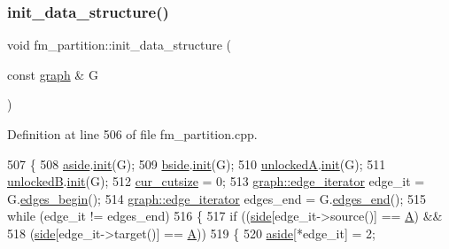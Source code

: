 \subsubsection{\texorpdfstring{init\+\_\+data\+\_\+structure()}{init\_data\_structure()}}
{\footnotesize\ttfamily void fm\+\_\+partition\+::init\+\_\+data\+\_\+structure (\begin{DoxyParamCaption}\item[{const \mbox{\hyperlink{classgraph}{graph}} \&}]{G }\end{DoxyParamCaption})\hspace{0.3cm}{\ttfamily [protected]}}



Definition at line 506 of file fm\+\_\+partition.\+cpp.


\begin{DoxyCode}
507 \{
508     \mbox{\hyperlink{classfm__partition_a14b0aa9a91a6e7fa3035669cf5056275}{aside}}.\mbox{\hyperlink{classne__map_a4ef2ab4aebcb57a7a101975bf6a88e24}{init}}(G);
509     \mbox{\hyperlink{classfm__partition_aa75765887173fb06b076b6cae12d4e66}{bside}}.\mbox{\hyperlink{classne__map_a4ef2ab4aebcb57a7a101975bf6a88e24}{init}}(G);
510     \mbox{\hyperlink{classfm__partition_a9d75a1d63f711a0c66ae7f5bc181cd8b}{unlockedA}}.\mbox{\hyperlink{classne__map_a4ef2ab4aebcb57a7a101975bf6a88e24}{init}}(G);
511     \mbox{\hyperlink{classfm__partition_a74865bf3e6b6f73350c43c3ad9dfda96}{unlockedB}}.\mbox{\hyperlink{classne__map_a4ef2ab4aebcb57a7a101975bf6a88e24}{init}}(G);
512     \mbox{\hyperlink{classfm__partition_abc8f24c354d2a15f8ec8ef9a46252c93}{cur\_cutsize}} = 0;
513     \mbox{\hyperlink{classgraph_a818d3766018eb0af91d520ce2150203c}{graph::edge\_iterator}} edge\_it = G.\mbox{\hyperlink{classgraph_a7ba35a4c4e8343ffb27ed6d9703c6f18}{edges\_begin}}();
514     \mbox{\hyperlink{classgraph_a818d3766018eb0af91d520ce2150203c}{graph::edge\_iterator}} edges\_end = G.\mbox{\hyperlink{classgraph_aea8d7f976b85b6137f52d915e26639f6}{edges\_end}}();
515     \textcolor{keywordflow}{while} (edge\_it != edges\_end)
516     \{
517     \textcolor{keywordflow}{if} ((\mbox{\hyperlink{classfm__partition_af83309e781e9658fc0ff923ced087bfc}{side}}[edge\_it->source()] == \mbox{\hyperlink{classfm__partition_a738e75c601403754e61e6dac623fd3ab}{A}}) &&
518         (\mbox{\hyperlink{classfm__partition_af83309e781e9658fc0ff923ced087bfc}{side}}[edge\_it->target()] == \mbox{\hyperlink{classfm__partition_a738e75c601403754e61e6dac623fd3ab}{A}}))
519     \{
520         \mbox{\hyperlink{classfm__partition_a14b0aa9a91a6e7fa3035669cf5056275}{aside}}[*edge\_it] = 2;

\end{DoxyCode}
